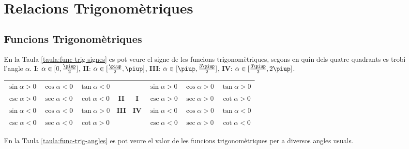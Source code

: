 \chapter{Relacions Trigonomètriques}

\section{Funcions Trigonomètriques}

En la Taula \vref{taula:func-trig-signes} es pot veure el signe de
les funcions trigonomètriques, segons en quin dels quatre quadrants
es trobi l'angle $\alpha$. \textbf{I}: $\alpha\in[0,\frac{\piup}{2}]$, \textbf{II}:
$\alpha\in[\frac{\piup}{2},\piup]$, \textbf{III}:
$\alpha\in[\piup,\frac{3\piup}{2}]$, \textbf{IV}:
$\alpha\in[\frac{3\piup}{2},2\piup]$.

\begin{center}
   \label{taula:func-trig-signes}
   \begin{tabular}{cccc|cccc}
   {\color{Green}$\sin\alpha > 0$} & {\color{Red}$\cos\alpha < 0$} & {\color{Red}$\tan\alpha < 0$} & & &
   {\color{Green}$\sin\alpha > 0$} & {\color{Green}$\cos\alpha > 0$} & {\color{Green}$\tan\alpha > 0$} \\
   {\color{Green}$\csc\alpha > 0$} & {\color{Red}$\sec\alpha < 0$} & {\color{Red}$\cot\alpha < 0$} & \textbf{II}&
   \textbf{I} & {\color{Green}$\csc\alpha > 0$} & {\color{Green}$\sec\alpha > 0$} & {\color{Green}$\cot\alpha > 0$} \\
   \hline
   {\color{Red}$\sin\alpha < 0$} & {\color{Red}$\cos\alpha < 0$} & {\color{Green}$\tan\alpha > 0$}
   &\textbf{III} &
   \textbf{IV} & {\color{Red}$\sin\alpha < 0$} & {\color{Green}$\cos\alpha > 0$} & {\color{Red}$\tan\alpha < 0$} \\
   {\color{Red}$\csc\alpha < 0$} & {\color{Red}$\sec\alpha < 0$} & {\color{Green}$\cot\alpha > 0$}  & & &
   {\color{Red}$\csc\alpha < 0$} & {\color{Green}$\sec\alpha > 0$} & {\color{Red}$\cot\alpha < 0$}
   \end{tabular}
\end{center}

En la Taula \vref{taula:func-trig-angles} es pot veure el valor de
les funcions trigonomètriques per a diversos angles usuals.

